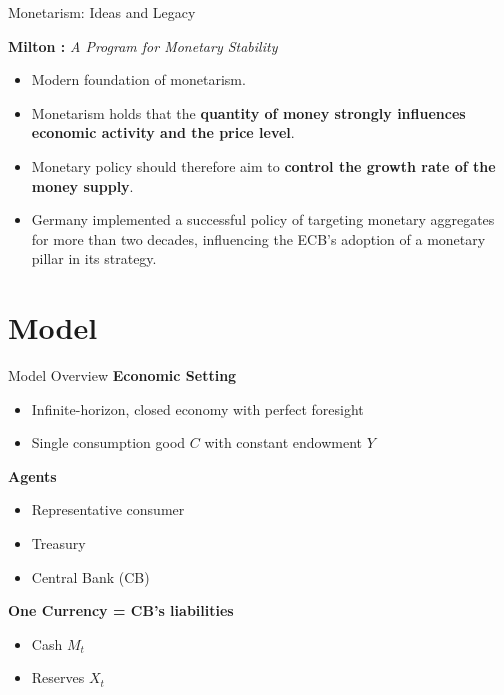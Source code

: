 \documentclass[11pt,aspectratio=169]{beamer}
\begin{document}
\begin{frame}{Monetarism: Ideas and Legacy}
\small

\textbf{Milton \textcite{friedman1960program}:} \textit{A Program for Monetary Stability}

\vspace{0.6em}

\begin{itemize}

    \item Modern foundation of monetarism.

    \vspace{0.6em}

    \item Monetarism holds that the \textbf{quantity of money strongly influences economic activity and the price level}.

    \vspace{0.6em}

    \item Monetary policy should therefore aim to \textbf{control the growth rate of the money supply}.

    \vspace{0.6em}

    \item Germany implemented a successful policy of targeting monetary aggregates for more than two decades, influencing the ECB’s adoption of a monetary pillar in its strategy.

\end{itemize}
\end{frame}



\section{Model}

\begin{frame}{Model Overview}
\textbf{Economic Setting}
\begin{itemize}
  \item Infinite-horizon, closed economy with perfect foresight
  \item Single consumption good $C$ with constant endowment $Y$
\end{itemize}

\textbf{Agents}
\begin{itemize}
  \item Representative consumer
  \item Treasury
  \item Central Bank (CB)
\end{itemize}

\textbf{One Currency = CB's liabilities}
\begin{itemize}
  \item Cash $M_t$
  \item Reserves $X_t$
\end{itemize}
\end{frame}
\end{document}

